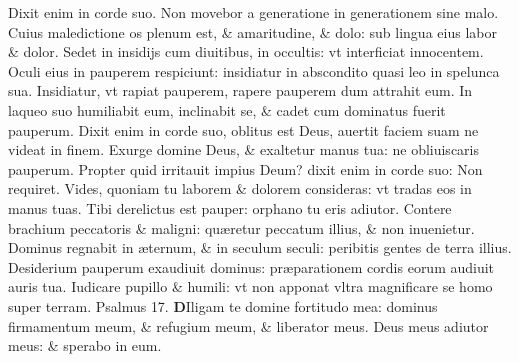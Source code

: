 \documentclass[a5paper,10pt]{book}
\def\ae{æ}
\begin{document}
\begin{multicols*}{2}
\newline \color{red} D\color{black}ixit enim in corde suo. Non movebor a generatione in generationem sine malo.
\newline \color{red} C\color{black}uius maledictione os plenum est, \& amaritudine, \& dolo: sub lingua eius labor \& dolor.
\newline \color{red} S\color{black}edet in insidijs cum diuitibus, in occultis: vt interficiat innocentem.
\newline \color{red} O\color{black}culi eius in pauperem respiciunt: insidiatur in abscondito quasi leo in spelunca sua.
\newline \color{red} I\color{black}nsidiatur, vt rapiat pauperem, rapere pauperem dum attrahit eum.
\newline \color{red} I\color{black}n laqueo suo humiliabit eum, inclinabit se, \& cadet cum dominatus fuerit pauperum.
\newline \color{red} D\color{black}ixit enim in corde suo, oblitus est Deus, auertit faciem suam ne videat in finem.
\newline \color{red} E\color{black}xurge domine Deus, \& exaltetur manus tua: ne obliuiscaris pauperum.
\newline \color{red} P\color{black}ropter quid irritauit impius Deum? dixit enim in corde suo: Non requiret.
\newline \color{red} V\color{black}ides, quoniam tu laborem \& dolorem consideras: vt tradas eos in manus tuas.
\newline \color{red} T\color{black}ibi derelictus est pauper: orphano tu eris adiutor.
\newline \color{red} C\color{black}ontere brachium peccatoris \& maligni: qu\ae retur peccatum illius, \& non inuenietur.
\newline \color{red} D\color{black}ominus regnabit in \ae ternum, \& in seculum seculi: peribitis gentes de terra illius.
\newline \color{red} D\color{black}esiderium pauperum exaudiuit dominus: pr\ae parationem cordis eorum audiuit auris tua.
\newline \color{red} I\color{black}udicare pupillo \& humili: vt non apponat vltra magnificare se homo super terram. \quad \color{red} Psalmus \hypertarget{ps17}{17.} \color{black}
\vspace{-1em}
\lettrine[lines=2]{\bfseries \color{red} D}{}Iligam te domine fortitudo mea: dominus firmamentum meum, \& refugium meum, \& liberator meus.
\newline \color{red} D\color{black}eus meus adiutor meus: \& sperabo in eum.

\end{multicols*}
\end{document}
